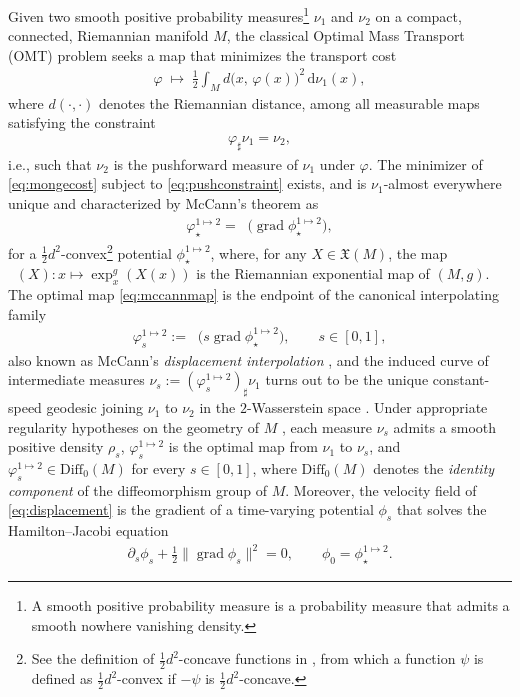 \documentclass{article}
\theoremstyle{remark}
\newcommand{\M}{M}
\newcommand{\cconv}{$\tfrac{1}{2}d^2$-convex}
\newcommand{\Diff}{\mathrm{Diff}_0(\M)}
\DeclareMathOperator{\grad}{\mathrm{grad}}
\DeclareMathOperator{\expg}{\mathrm{exp}^{\text{$g$}}}
\begin{document}
Given two smooth positive probability measures\footnote{A smooth positive probability measure is a probability measure that admits a smooth nowhere vanishing density.} $\nu_{1}$ and $\nu_{2}$
on a compact, connected, Riemannian manifold $\M$, the classical Optimal Mass Transport (OMT) problem seeks a map that minimizes the transport cost
%
\begin{align}\label{eq:mongecost}
    \varphi \;\longmapsto\; \frac{1}{2}\int_{\M}
    d\bigl( x,\, \varphi(x) \bigr)^{2}\, \mathrm{d}\nu_{1}(x),
\end{align}
%
where $d(\cdot,\cdot)$ denotes the Riemannian distance, among all measurable maps
satisfying the constraint
%
\begin{align}\label{eq:pushconstraint}
    \varphi_{\sharp}\nu_{1} = \nu_{2},
\end{align}
%
i.e., such that $\nu_{2}$ is the pushforward measure of $\nu_{1}$ under
$\varphi$. The minimizer of \eqref{eq:mongecost} subject to
\eqref{eq:pushconstraint} exists, and is $\nu_1$-almost everywhere unique and characterized by McCann's theorem \cite{McCann2001} as
%
\begin{align}\label{eq:mccannmap}
    \varphi_\star^{1\mapsto2} = \expg\bigl( \grad \phi_\star^{1\mapsto2}\bigr),
\end{align}
%
for a $\tfrac{1}{2}d^{2}$-convex\footnote{See the definition of $\tfrac{1}{2}d^{2}$-concave functions in \cite{McCann2001}, from which a function $\psi$ is defined as \cconv{} if $-\psi$ is $\tfrac{1}{2}d^{2}$-concave.} potential $\phi_\star^{1\mapsto2}$, where, for any $X\in\mathfrak{X}(\M)$, the map $\expg(X):x\mapsto\exp_x^g(X(x))$ is the Riemannian exponential map of $(\M,g)$.
%
The optimal map \eqref{eq:mccannmap} is the endpoint of the canonical interpolating family
%
\begin{align}\label{eq:displacement}
    \varphi^{1\mapsto2}_{s} := \expg\bigl( s \grad\phi^{1\mapsto2}_\star\bigr),
    \qquad s \in [0,1],
\end{align}
%
also known as McCann's
\emph{displacement interpolation} \cite{McCann1997}, and the induced curve of intermediate measures
$\nu_{s} := (\varphi^{1\mapsto2}_{s})_{\sharp}\nu_{1}$ turns out to be the unique constant-speed geodesic joining $\nu_{1}$ to $\nu_{2}$ in the $2$-Wasserstein space \cite{McCann2001,McCann1997}.
%
Under appropriate regularity hypotheses on the geometry of $\M$ \cite{MaTrudingerWang2005}, each measure $\nu_{s}$ admits a smooth positive density $\rho_s$, $\varphi_{s}^{1\mapsto2}$ is the optimal map from $\nu_{1}$ to $\nu_{s}$, and $\varphi^{1\mapsto2}_{s} \in \Diff$ for every
$s \in [0,1]$, where $\Diff$ denotes the \emph{identity component} of the diffeomorphism group of
$\M$. Moreover, the velocity field of \eqref{eq:displacement} is the gradient of a time-varying potential $\phi_{s}$ that solves the Hamilton--Jacobi equation
%
\begin{align}\label{eq:HJB}
    \partial_{s}\phi_{s} + \tfrac{1}{2}\|\grad\phi_{s}\|^{2} = 0, \qquad \phi_{0} = \phi^{1\mapsto2}_\star.
\end{align}
\end{document}
